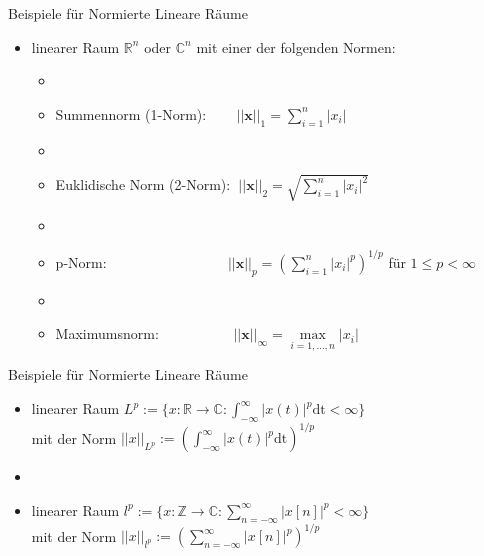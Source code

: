 \documentclass[14pt, aspectratio=169, handout]{beamer}
\begin{document}
\begin{frame}{Beispiele für Normierte Lineare Räume}
    \begin{itemize}
        \item linearer Raum $\mathbb{R}^n$ oder $\mathbb{C}^n$ mit einer der folgenden Normen: \begin{itemize}
        \item[] 
        \item[] Summennorm (1-Norm): $\hspace{22pt}||\mathbf{x}||_1 = \sum_{i=1}^n |x_i|$
        \item[] 
        \item[] Euklidische Norm (2-Norm): $\hspace{3pt}||\mathbf{x}||_2 = \sqrt{\sum_{i=1}^n |x_i|^2}$
        \item[] 
        \item[] p-Norm: $\hspace{100pt}||\mathbf{x}||_p = \left(\sum_{i=1}^n |x_i|^p\right)^{1/p}$ für $1\leq p < \infty$
        \item[] 
        \item[] Maximumsnorm: $\hspace{60pt}||\mathbf{x}||_\infty = \underset{i=1,\dots,n}{\max}|x_i|$
        \end{itemize}
    \end{itemize}
\end{frame}

\begin{frame}{Beispiele für Normierte Lineare Räume}
    \begin{itemize}
        \item linearer Raum $L^p := \{ x:\mathbb{R}\to \mathbb{C} : \int_{-\infty}^\infty |x(t)|^p \text{dt} < \infty \} $ \\mit der Norm $||x||_{L^p} := \left( \int_{-\infty}^\infty |x(t)|^p \text{dt}\right)^{1/p}$
        \item[] 
        \item linearer Raum $l^p :=\{ x:\mathbb{Z}\to \mathbb{C} : \sum_{n=-\infty}^\infty |x[n]|^p < \infty \} $ \\mit der Norm $||x||_{l^p} := \left( \sum_{n=-\infty}^\infty |x[n]|^p \right)^{1/p}$
    \end{itemize}
\end{frame}
\end{document}
